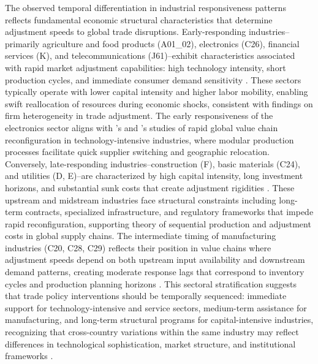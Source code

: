 \documentclass[preprint, 3p,
authoryear]{elsarticle} %
\begin{document}
The observed temporal differentiation in industrial responsiveness
patterns reflects fundamental economic structural characteristics that
determine adjustment speeds to global trade disruptions.
Early-responding industries--primarily agriculture and food products
(A01\_02), electronics (C26), financial services (K), and
telecommunications (J61)--exhibit characteristics associated with rapid
market adjustment capabilities: high technology intensity, short
production cycles, and immediate consumer demand sensitivity
\citep{acemoglu2012competing, autor2020fall}. These sectors typically
operate with lower capital intensity and higher labor mobility, enabling
swift reallocation of resources during economic shocks, consistent with
\citet{melitz2014heterogeneous} findings on firm heterogeneity in trade
adjustment. The early responsiveness of the electronics sector aligns
with \citet{timmer2014slicing}'s and \citet{kordalska2025decoding}'s
studies of rapid global value chain reconfiguration in
technology-intensive industries, where modular production processes
facilitate quick supplier switching and geographic relocation.
Conversely, late-responding industries--construction (F), basic
materials (C24), and utilities (D, E)--are characterized by high capital
intensity, long investment horizons, and substantial sunk costs that
create adjustment rigidities \citep{decker2020changing}. These upstream
and midstream industries face structural constraints including long-term
contracts, specialized infrastructure, and regulatory frameworks that
impede rapid reconfiguration, supporting \citet{antras2013organizing}
theory of sequential production and adjustment costs in global supply
chains. The intermediate timing of manufacturing industries (C20, C28,
C29) reflects their position in value chains where adjustment speeds
depend on both upstream input availability and downstream demand
patterns, creating moderate response lags that correspond to inventory
cycles and production planning horizons \citep{alfaro2019internalizing}.
This sectoral stratification suggests that trade policy interventions
should be temporally sequenced: immediate support for
technology-intensive and service sectors, medium-term assistance for
manufacturing, and long-term structural programs for capital-intensive
industries, recognizing that cross-country variations within the same
industry may reflect differences in technological sophistication, market
structure, and institutional frameworks
\citep{caselli2020diversification, conteduca2025trade}.
\end{document}
